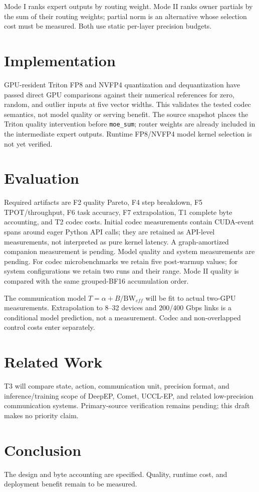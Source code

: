 \documentclass[10pt,twocolumn]{article}
\begin{document}
Mode I ranks expert outputs by routing weight. Mode II ranks owner partials by the sum of their routing weights; partial norm is an alternative whose selection cost must be measured. Both use static per-layer precision budgets.

\section{Implementation}
GPU-resident Triton FP8 and NVFP4 quantization and dequantization have passed direct GPU comparisons against their numerical references for zero, random, and outlier inputs at five vector widths. This validates the tested codec semantics, not model quality or serving benefit. The source snapshot places the Triton quality intervention before \texttt{moe\_sum}; router weights are already included in the intermediate expert outputs. Runtime FP8/NVFP4 model kernel selection is not yet verified.
\section{Evaluation}
Required artifacts are F2 quality Pareto, F4 step breakdown, F5 TPOT/throughput, F6 task accuracy, F7 extrapolation, T1 complete byte accounting, and T2 codec costs. Initial codec measurements contain CUDA-event spans around eager Python API calls; they are retained as API-level measurements, not interpreted as pure kernel latency. A graph-amortized companion measurement is pending. Model quality and system measurements are pending. For codec microbenchmarks we retain five post-warmup values; for system configurations we retain two runs and their range. Mode II quality is compared with the same grouped-BF16 accumulation order.

The communication model $T=\alpha+B/\mathrm{BW}_{eff}$ will be fit to actual two-GPU measurements. Extrapolation to 8--32 devices and 200/400 Gbps links is a conditional model prediction, not a measurement. Codec and non-overlapped control costs enter separately.
\section{Related Work}
T3 will compare state, action, communication unit, precision format, and inference/training scope of DeepEP, Comet, UCCL-EP, and related low-precision communication systems. Primary-source verification remains pending; this draft makes no priority claim.
\section{Conclusion}
The design and byte accounting are specified. Quality, runtime cost, and deployment benefit remain to be measured.
\end{document}
